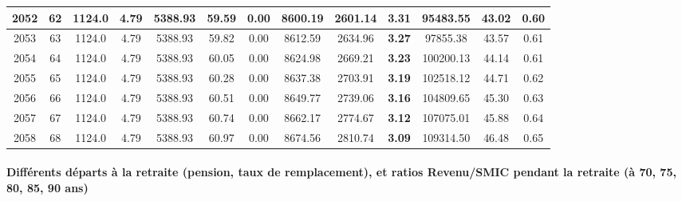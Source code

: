 {\begin{center}
\begin{tabular}[htb]{|c|c||c|c|c|c|c|c||c|c||c|c|c||}
\hline 
 2052 &  62 &  1124.0 &  4.79 &  5388.93 &  59.59 &  0.00 &  8600.19 &  2601.14 &  {\bf 3.31} &  95483.55 &  43.02 &  0.60 \\ 
\hline 
 2053 &  63 &  1124.0 &  4.79 &  5388.93 &  59.82 &  0.00 &  8612.59 &  2634.96 &  {\bf 3.27} &  97855.38 &  43.57 &  0.61 \\ 
\hline 
 2054 &  64 &  1124.0 &  4.79 &  5388.93 &  60.05 &  0.00 &  8624.98 &  2669.21 &  {\bf 3.23} &  100200.13 &  44.14 &  0.61 \\ 
\hline 
 2055 &  65 &  1124.0 &  4.79 &  5388.93 &  60.28 &  0.00 &  8637.38 &  2703.91 &  {\bf 3.19} &  102518.12 &  44.71 &  0.62 \\ 
\hline 
 2056 &  66 &  1124.0 &  4.79 &  5388.93 &  60.51 &  0.00 &  8649.77 &  2739.06 &  {\bf 3.16} &  104809.65 &  45.30 &  0.63 \\ 
\hline 
 2057 &  67 &  1124.0 &  4.79 &  5388.93 &  60.74 &  0.00 &  8662.17 &  2774.67 &  {\bf 3.12} &  107075.01 &  45.88 &  0.64 \\ 
\hline 
 2058 &  68 &  1124.0 &  4.79 &  5388.93 &  60.97 &  0.00 &  8674.56 &  2810.74 &  {\bf 3.09} &  109314.50 &  46.48 &  0.65 \\ 
\hline 
\hline 
\end{tabular} 
\end{center} } 
\newpage 
 
\paragraph{Différents départs à la retraite (pension, taux de remplacement), et ratios Revenu/SMIC pendant la retraite (à 70, 75, 80, 85, 90 ans)} 


